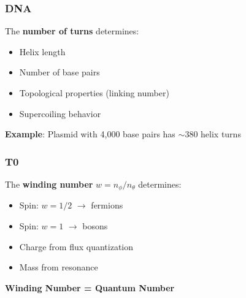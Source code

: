 	\subsubsection{DNA}

	The \textbf{number of turns} determines:
	\begin{itemize}
		\item Helix length
		\item Number of base pairs
		\item Topological properties (linking number)
		\item Supercoiling behavior
	\end{itemize}

	\textbf{Example}: Plasmid with 4,000 base pairs has $\sim$380 helix turns

	\subsubsection{T0}

	The \textbf{winding number} $w = n_\phi / n_\theta$ determines:
	\begin{itemize}
		\item Spin: $w = 1/2$ $\to$ fermions
		\item Spin: $w = 1$ $\to$ bosons
		\item Charge from flux quantization
		\item Mass from resonance
	\end{itemize}

	\begin{keyresult}
		\textbf{Winding Number = Quantum Number}

		\vspace{0.3cm}

		\begin{center}
		\end{center}
	\end{keyresult}

